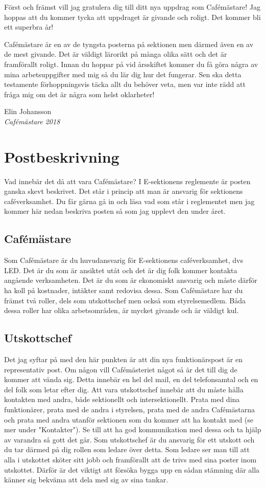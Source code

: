 \documentclass[10pt]{article}
\begin{document}
\heading{\doctitle}

Först och främst vill jag gratulera dig till ditt nya uppdrag som Cafémästare! Jag hoppas att du kommer tycka att uppdraget är givande och roligt. Det kommer bli ett superbra år!

Cafémästare är en av de tyngsta posterna på sektionen men därmed även en av de mest givande. Det är väldigt lärorikt på många olika sätt och det är framförallt roligt. Innan du hoppar på vid årsskiftet kommer du få göra några av mina arbetsuppgifter med mig så du lär dig hur det fungerar. Sen ska detta testamente förhoppningsvis täcka allt du behöver veta, men var inte rädd att fråga mig om det är några som helst oklarheter!

Elin Johansson\\
\emph{Cafémästare 2018}

\newpage
\tableofcontents

\newpage
\section{Postbeskrivning}
Vad innebär det då att vara Cafémästare? I E-sektionens reglemente är posten ganska skevt beskrivet. Det står i princip att man är ansvarig för sektionens caféverksamhet. Du får gärna gå in och läsa vad som står i reglementet men jag kommer här nedan beskriva posten så som jag upplevt den under året.

\subsection{Cafémästare}
Som Cafémästare är du huvudansvarig för E-sektionens caféverksamhet, dvs LED. Det är du som är ansiktet utåt och det är dig folk kommer kontakta angående verksamheten. Det är du som är ekonomiskt ansvarig och måste därför ha koll på kostnader, intäkter samt redovisa dessa. Som Cafémästare har du främst två roller, dels som utskottschef men också som styrelsemedlem. Båda dessa roller har olika arbetsområden, är mycket givande och är väldigt kul.

\subsection{Utskottschef}
Det jag syftar på med den här punkten är att din nya funktionärspost är en representativ post. Om någon vill Cafémästeriet något så är det till dig de kommer att vända sig. Detta innebär en hel del mail, en del telefonsamtal och en del folk som letar efter dig. Att vara utskottschef innebär att du måste hålla kontakten med andra, både sektionellt och intersektionellt. Prata med dina funktionärer, prata med de andra i styrelsen, prata med de andra Cafémästarna och prata med andra utanför sektionen som du kommer att ha kontakt med (se mer under "Kontakter"). Se till att ha god kommunikation med dessa och ta hjälp av varandra så gott det går. Som utskottschef är du ansvarig för ett utskott och du tar därmed på dig rollen som ledare över detta. Som ledare ser man till att alla i utskottet sköter sitt jobb och framförallt att de trivs med sina poster inom utskottet. Därför är det viktigt att försöka bygga upp en sådan stämning där alla känner sig bekväma att dela med sig av sina tankar.
\end{document}
